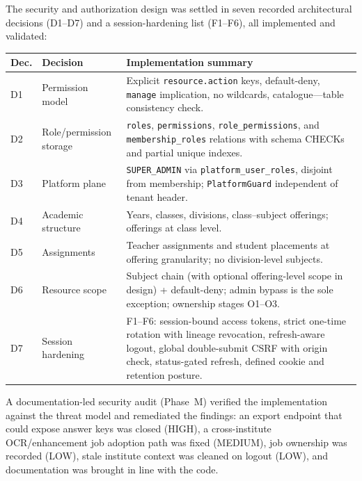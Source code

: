 \noindent The security and authorization design was settled in seven recorded
architectural decisions (D1--D7) and a session-hardening list (F1--F6), all
implemented and validated:

\begin{center}
\small
\begin{tabular}{@{}p{0.7cm}p{5.1cm}p{8.2cm}@{}}
\toprule
\textbf{Dec.} & \textbf{Decision} & \textbf{Implementation summary} \\
\midrule
D1 & Permission model & Explicit \texttt{resource.action} keys, default-deny,
\texttt{manage} implication, no wildcards, catalogue---table consistency check. \\
D2 & Role/permission storage & \texttt{roles}, \texttt{permissions},
\texttt{role\_permissions}, and \texttt{membership\_roles} relations with
schema CHECKs and partial unique indexes. \\
D3 & Platform plane & \texttt{SUPER\_ADMIN} via
\texttt{platform\_user\_roles}, disjoint from membership; \texttt{PlatformGuard}
independent of tenant header. \\
D4 & Academic structure & Years, classes, divisions, class--subject offerings;
offerings at class level. \\
D5 & Assignments & Teacher assignments and student placements at offering
granularity; no division-level subjects. \\
D6 & Resource scope & Subject chain (with optional offering-level scope in
design) + default-deny; admin bypass is the sole exception; ownership
stages O1--O3. \\
D7 & Session hardening & F1--F6: session-bound access tokens, strict one-time
rotation with lineage revocation, refresh-aware logout, global double-submit
CSRF with origin check, status-gated refresh, defined cookie and retention
posture. \\
\bottomrule
\end{tabular}
\end{center}

\noindent A documentation-led security audit (Phase~M) verified the
implementation against the threat model and remediated the findings: an export
endpoint that could expose answer keys was closed (HIGH), a cross-institute
OCR/enhancement job adoption path was fixed (MEDIUM), job ownership was
recorded (LOW), stale institute context was cleaned on logout (LOW), and
documentation was brought in line with the code.